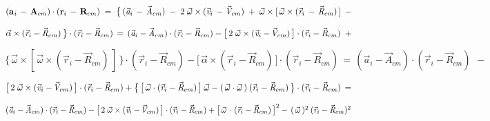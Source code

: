 \documentclass[10pt]{article}
\begin{document}
\par \bigskip\smallskip \noindent $({\mathbf{a}}_{\hspace{+0.045em}i} \,-\, {\mathbf{A}}_{cm}) \cdot ({\mathbf{r}}_i \,-\, {\mathbf{R}}_{cm}) \;=\; \big \{ \, ({\vec{\mathit{a}}}_i \,-\, {\vec{\mathit{A}}}_{cm}) \;-\; 2 \; {\vec{\omega}} \times ({\vec{\mathit{v}}}_i \,-\, \hspace{-0.120em}{\vec{\mathit{V}}}_{cm}) \;+\; {\vec{\omega}} \times [ \, {\vec{\omega}} \times ({\vec{\mathit{r}}}_i \,-\, {\vec{\mathit{R}}}_{cm}) \, ] ~\,-$

\par \bigskip\smallskip \noindent ${\vec{\alpha}} \times ({\vec{\mathit{r}}}_i - {\vec{\mathit{R}}}_{cm}) \, \big \} \cdot ({\vec{\mathit{r}}}_i - {\vec{\mathit{R}}}_{cm}) \,=\, ({\vec{\mathit{a}}}_i - {\vec{\mathit{A}}}_{cm}) \cdot ({\vec{\mathit{r}}}_i - {\vec{\mathit{R}}}_{cm}) - \big [ \, 2 \; {\vec{\omega}} \times ({\vec{\mathit{v}}}_i - \hspace{-0.120em}{\vec{\mathit{V}}}_{cm}) \, \big ] \cdot ({\vec{\mathit{r}}}_i - {\vec{\mathit{R}}}_{cm}) ~\,+$

\par \bigskip\smallskip \noindent $\big \{ \, {\vec{\omega}} \times [ \, {\vec{\omega}} \times ({\vec{\mathit{r}}}_i - {\vec{\mathit{R}}}_{cm}) \, ] \, \big \} \cdot ({\vec{\mathit{r}}}_i - {\vec{\mathit{R}}}_{cm}) - \big [ \, {\vec{\alpha}} \times ({\vec{\mathit{r}}}_i - {\vec{\mathit{R}}}_{cm}) \, \big ] \cdot ({\vec{\mathit{r}}}_i - {\vec{\mathit{R}}}_{cm}) \,=\, ({\vec{\mathit{a}}}_i - {\vec{\mathit{A}}}_{cm}) \cdot ({\vec{\mathit{r}}}_i - {\vec{\mathit{R}}}_{cm}) ~\,-$

\par \bigskip\smallskip \noindent $\big [ \, 2 \; {\vec{\omega}} \times ({\vec{\mathit{v}}}_i - \hspace{-0.120em}{\vec{\mathit{V}}}_{cm}) \, \big ] \cdot ({\vec{\mathit{r}}}_i - {\vec{\mathit{R}}}_{cm}) + \big \{ \, \big [ \, {\vec{\omega}} \cdot ({\vec{\mathit{r}}}_i - {\vec{\mathit{R}}}_{cm}) \, \big ] \: {\vec{\omega}} - ( \, {\vec{\omega}} \cdot {\vec{\omega}} \, ) \: ({\vec{\mathit{r}}}_i - {\vec{\mathit{R}}}_{cm}) \, \big \} \cdot ({\vec{\mathit{r}}}_i - {\vec{\mathit{R}}}_{cm}) \,=$

\par \bigskip\smallskip \noindent $({\vec{\mathit{a}}}_i - {\vec{\mathit{A}}}_{cm}) \cdot ({\vec{\mathit{r}}}_i - {\vec{\mathit{R}}}_{cm}) - \big [ \, 2 \; {\vec{\omega}} \times ({\vec{\mathit{v}}}_i - \hspace{-0.120em}{\vec{\mathit{V}}}_{cm}) \, \big ] \cdot ({\vec{\mathit{r}}}_i - {\vec{\mathit{R}}}_{cm}) + \big [ \, {\vec{\omega}} \hspace{+0.120em}\cdot\hspace{+0.090em} ({\vec{\mathit{r}}}_i - {\vec{\mathit{R}}}_{cm}) \, \big ]^2 -\, ( \, {\vec{\omega}} \, )^2 \: ({\vec{\mathit{r}}}_i - {\vec{\mathit{R}}}_{cm})^2$
\end{document}
